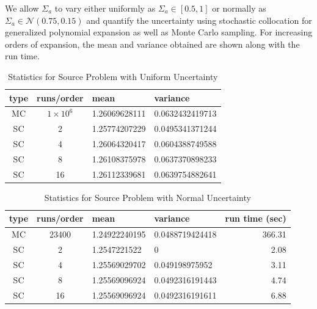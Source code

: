We allow $\Sigma_a$ to vary either uniformly as $\Sigma_a\in[0.5,1]$ or normally as $\Sigma_a\in\mathcal{N}(0.75,0.15)$ and quantify the uncertainty using stochastic collocation for generalized polynomial expansion as well as Monte Carlo sampling.
For increasing orders of expansion, the mean and variance obtained are shown along with the run time.
\begin{table}
\begin{center}
\begin{tabular}{c c|l l}
type & runs/order & mean & variance \\ \hline
MC & $1\times10^6$ & 1.26069628111 & 0.0632432419713\\
SC & 2 & 1.25774207229 & 0.0495341371244 \\
SC & 4 & 1.26064320417 & 0.0604388749588 \\
SC & 8 & 1.26108375978 & 0.0637370898233\\
SC & 16 & 1.26112339681 & 0.0639754882641
\end{tabular}
\end{center}
\caption{Statistics for Source Problem with Uniform Uncertainty}
\end{table}

\begin{table}[h!]
\begin{center}
\begin{tabular}{c c|l l| r}
type & runs/order & mean & variance & run time (sec) \\ \hline
MC & 23400 & 1.24922240195 & 0.0488719424418 & 366.31\\
SC & 2 & 1.2547221522 & 0 & 2.08 \\
SC & 4 & 1.25569029702 & 0.049198975952 & 3.11 \\
SC & 8 & 1.25569096924 & 0.0492316191443 & 4.74\\
SC & 16 & 1.25569096924 & 0.0492316191611 & 6.88
\end{tabular}
\end{center}
\caption{Statistics for Source Problem with Normal Uncertainty}
\end{table}

